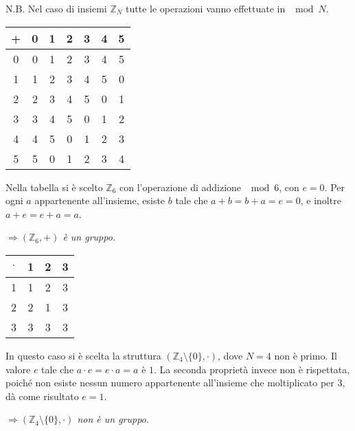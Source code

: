 \documentclass[a4paper]{report}
\begin{document}
N.B. Nel caso di insiemi $\mathbb{Z}_N$ tutte le operazioni vanno effettuate in $\mod{N}$.
\begin{center}
\begin{tabular}{ c | c c c c c c}
 + & 0 & 1 & 2 & 3 & 4 & 5 \\ 
 \hline
 0 & 0 & 1 & 2 & 3 & 4 & 5 \\
 1 & 1 & 2 & 3 & 4 & 5 & 0 \\
 2 & 2 & 3 & 4 & 5 & 0 & 1 \\
 3 & 3 & 4 & 5 & 0 & 1 & 2 \\
 4 & 4 & 5 & 0 & 1 & 2 & 3 \\
 5 & 5 & 0 & 1 & 2 & 3 & 4    
\end{tabular}
\end{center}
Nella tabella si è scelto $\mathbb{Z}_6$ con l'operazione di addizione $\mod{6}$, con $e=0$. Per ogni $a$ appartenente all'insieme, esiste $b$ tale che $a+b=b+a=e=0$, e inoltre $a+e=e+a=a$.
\begin{center}
\textit{$\Rightarrow (\mathbb{Z}_6,+)$ è un gruppo.}
\end{center}
\begin{center}
\begin{tabular}{ c | c c c }
$\cdot$ & 1 & 2 & 3\\ 
 \hline
 1 & 1 & 2 & 3 \\
 2 & 2 & 1 & 3 \\
 3 & 3 & 3 & 3 
\end{tabular}
\end{center}
In questo caso si è scelta la struttura $(\mathbb{Z}_4\setminus \{ 0\},\cdot )$, dove $N=4$ non è primo. Il valore $e$ tale che $a\cdot e = e\cdot a = a$ è $1$. La seconda proprietà invece non è rispettata, poiché non esiste nessun numero appartenente all'insieme che moltiplicato per $3$, dà come risultato $e=1$.
\begin{center}
\textit{$\Rightarrow (\mathbb{Z}_4\setminus \{ 0\},\cdot )$ non è un gruppo.}
\end{center}
\end{document}
